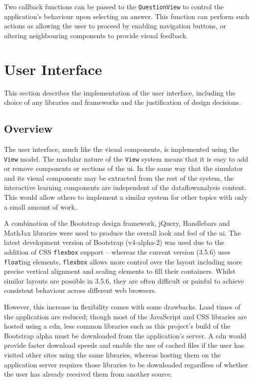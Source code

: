 \documentclass[bsc,twoside,singlespacing,parskip,logo,notimes,normalheadings]{infthesis}
\begin{document}
        Two callback functions can be passed to the {\tt QuestionView}
        to control the application's behaviour upon selecting an
        answer. This function can perform such actions as allowing the
        user to proceed by enabling navigation buttons, or altering
        neighbouring components to provide visual feedback.
            
    \pagebreak

    \section{User Interface}
    This section describes the implementation of the user interface,
    including the choice of any libraries and frameworks and the
    justification of design decisions.
    
        \subsection{Overview}
    
        The user interface, much like the visual components, is
        implemented using the {\tt View} model. The modular nature of
        the {\tt View} system means that it is easy to add or remove
        components or sections of the \gls{ui}. In the same way that the
        simulator and its visual components may be extracted from the
        rest of the system, the interactive learning components are
        independent of the \gls{dataflowanalysis} content. This would
        allow others to implement a similar system for other topics
        with only a small amount of work.

        A combination of the Bootstrap design framework, jQuery,
        Handlebars and MathJax libraries were used to produce the
        overall look and feel of the \gls{ui}. The latest development
        version of Bootstrap (v4-alpha-2) was used due to the addition
        of CSS {\tt flexbox} support -- whereas the current version
        (3.5.6) uses {\tt float}ing elements, {\tt flexbox} allows
        more control over the layout including more precise vertical
        alignment and scaling elements to fill their
        containers. Whilst similar layouts are possible in 3.5.6, they
        are often difficult or painful to achieve consistent behaviour
        across different web browsers.

        However, this increase in flexibility comes with some
        drawbacks. Load times of the application are reduced; though
        most of the JavaScript and CSS libraries are hosted using a
        \gls{cdn}, less common libraries such as this project's build
        of the Bootstrap alpha must be downloaded from the
        application's server. A \gls{cdn} would provide faster
        download speeds and enable the use of cached files if the user
        has visited other sites using the same libraries, whereas
        hosting them on the application server requires those
        libraries to be downloaded regardless of whether the user has
        already received them from another source.
    
\end{document}
